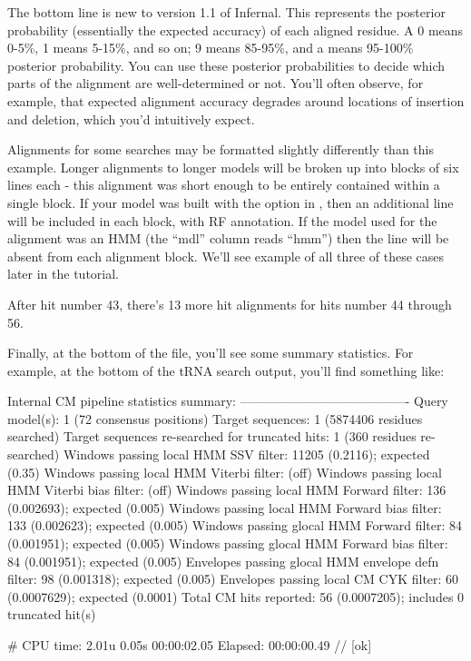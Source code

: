 The bottom line is new to version 1.1 of Infernal. This represents the
posterior probability (essentially the expected accuracy) of each
aligned residue. A 0 means 0-5\%, 1 means 5-15\%, and so on; 9 means
85-95\%, and a \otext{*} means 95-100\% posterior probability. You can
use these posterior probabilities to decide which parts of the
alignment are well-determined or not. You'll often observe, for
example, that expected alignment accuracy degrades around locations of
insertion and deletion, which you'd intuitively expect.

Alignments for some searches may be formatted slightly differently
than this example. Longer alignments to longer models will be broken
up into blocks of six lines each - this alignment was short enough to
be entirely contained within a single block.  If your model was built
with the  option in , then an additional
line will be included in each block, with RF annotation.  If the model
used for the alignment was an HMM (the ``mdl'' column reads ``hmm'')
then the  line will be absent from each alignment
block. We'll see example of all three of these cases later in the
tutorial.

After hit number 43, there's 13 more hit alignments for hits number 44
through 56. 

Finally, at the bottom of the file, you'll see some summary
statistics. For example, at the bottom of the tRNA search output,
you'll find something like:

\begin{sreoutput}
Internal CM pipeline statistics summary:
----------------------------------------
Query model(s):                                                  1  (72 consensus positions)
Target sequences:                                                1  (5874406 residues searched)
Target sequences re-searched for truncated hits:                 1  (360 residues re-searched)
Windows   passing  local HMM SSV           filter:           11205  (0.2116); expected (0.35)
Windows   passing  local HMM Viterbi       filter:                  (off)
Windows   passing  local HMM Viterbi  bias filter:                  (off)
Windows   passing  local HMM Forward       filter:             136  (0.002693); expected (0.005)
Windows   passing  local HMM Forward  bias filter:             133  (0.002623); expected (0.005)
Windows   passing glocal HMM Forward       filter:              84  (0.001951); expected (0.005)
Windows   passing glocal HMM Forward  bias filter:              84  (0.001951); expected (0.005)
Envelopes passing glocal HMM envelope defn filter:              98  (0.001318); expected (0.005)
Envelopes passing  local CM  CYK           filter:              60  (0.0007629); expected (0.0001)
Total CM hits reported:                                         56  (0.0007205); includes 0 truncated hit(s)

# CPU time: 2.01u 0.05s 00:00:02.05 Elapsed: 00:00:00.49
//
[ok]
\end{sreoutput}

